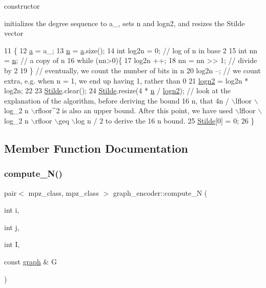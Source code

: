 constructor 

initializes the degree sequence to a\+\_\+, sets n and logn2, and resizes the Stilde vector 
\begin{DoxyCode}
11                                                  \{
12   \hyperlink{classgraph__encoder_a56eb5cf480ae5c2fca9f3a45f2ffd4f1}{a} = a\_;
13   \hyperlink{classgraph__encoder_a7fedc9ace19e34abb32f1851c8597591}{n} = \hyperlink{classgraph__encoder_a56eb5cf480ae5c2fca9f3a45f2ffd4f1}{a}.size();
14   \textcolor{keywordtype}{int} log2n = 0; \textcolor{comment}{// log of n in base 2}
15   \textcolor{keywordtype}{int} nn = \hyperlink{classgraph__encoder_a7fedc9ace19e34abb32f1851c8597591}{n}; \textcolor{comment}{// a copy of n}
16   \textcolor{keywordflow}{while} (nn>0)\{
17     log2n ++;
18     nn = nn >> 1; \textcolor{comment}{// divide by 2}
19   \} \textcolor{comment}{// eventually, we count the number of bits in n}
20   log2n --; \textcolor{comment}{// we count extra, e.g. when n = 1, we end up having 1, rather than 0}
21   \hyperlink{classgraph__encoder_a27fde3a95a280304877b1e37fc4d8553}{logn2} = log2n * log2n;
22 
23   \hyperlink{classgraph__encoder_a342688a3fdee511b7fae3f155cfb10cf}{Stilde}.clear();
24   \hyperlink{classgraph__encoder_a342688a3fdee511b7fae3f155cfb10cf}{Stilde}.resize(4 * \hyperlink{classgraph__encoder_a7fedc9ace19e34abb32f1851c8597591}{n} / \hyperlink{classgraph__encoder_a27fde3a95a280304877b1e37fc4d8553}{logn2}); \textcolor{comment}{// look at the explanation of the algorithm, before deriving
       the bound 16 n, that 4n / \(\backslash\)lfloor \(\backslash\)log\_2 n \(\backslash\)rfloor^2 is also an upper bound. After this point, we have used
       \(\backslash\)lfloor \(\backslash\)log\_2 n \(\backslash\)rfloor \(\backslash\)geq \(\backslash\)log n / 2 to derive the 16 n bound.}
25   \hyperlink{classgraph__encoder_a342688a3fdee511b7fae3f155cfb10cf}{Stilde}[0] = 0;
26 \}
\end{DoxyCode}


\subsection{Member Function Documentation}
\mbox{\label{classgraph__encoder_ae7273c47d6dab8367daa5ee6a9cdbc72}} 
\subsubsection{\texorpdfstring{compute\+\_\+\+N()}{compute\_N()}}
{\footnotesize\ttfamily pair$<$ mpz\+\_\+class, mpz\+\_\+class $>$ graph\+\_\+encoder\+::compute\+\_\+N (\begin{DoxyParamCaption}\item[{int}]{i,  }\item[{int}]{j,  }\item[{int}]{I,  }\item[{const \hyperlink{classgraph}{graph} \&}]{G }\end{DoxyParamCaption})}




